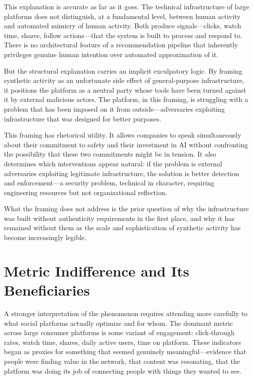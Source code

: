 \documentclass[12pt, a4paper]{article}
\begin{document}
This explanation is accurate as far as it goes. The technical infrastructure of large platforms does not distinguish, at a fundamental level, between human activity and automated mimicry of human activity. Both produce signals---clicks, watch time, shares, follow actions---that the system is built to process and respond to. There is no architectural feature of a recommendation pipeline that inherently privileges genuine human intention over automated approximation of it.

But the structural explanation carries an implicit exculpatory logic. By framing synthetic activity as an unfortunate side effect of general-purpose infrastructure, it positions the platform as a neutral party whose tools have been turned against it by external malicious actors. The platform, in this framing, is struggling with a problem that has been imposed on it from outside---adversaries exploiting infrastructure that was designed for better purposes.

This framing has rhetorical utility. It allows companies to speak simultaneously about their commitment to safety and their investment in AI without confronting the possibility that these two commitments might be in tension. It also determines which interventions appear natural: if the problem is external adversaries exploiting legitimate infrastructure, the solution is better detection and enforcement---a security problem, technical in character, requiring engineering resources but not organizational reflection.

What the framing does not address is the prior question of why the infrastructure was built without authenticity requirements in the first place, and why it has remained without them as the scale and sophistication of synthetic activity has become increasingly legible.

\section{Metric Indifference and Its Beneficiaries}

A stronger interpretation of the phenomenon requires attending more carefully to what social platforms actually optimize and for whom. The dominant metric across large consumer platforms is some variant of engagement: click-through rates, watch time, shares, daily active users, time on platform. These indicators began as proxies for something that seemed genuinely meaningful---evidence that people were finding value in the network, that content was resonating, that the platform was doing its job of connecting people with things they wanted to see.
\end{document}

